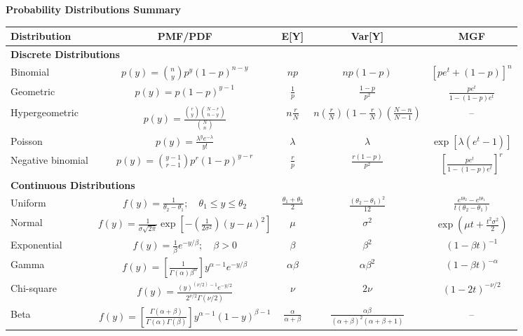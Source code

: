 \documentclass[10pt]{article}
\begin{document}
\begin{center}
\textbf{\Large Probability Distributions Summary}
\end{center}

\vspace{-2mm}
\renewcommand{\arraystretch}{1.6}
\begin{center}
\begin{tabular}{@{}l c c c c@{}}
\toprule
\textbf{Distribution} & \textbf{PMF/PDF} & \textbf{E[Y]} & \textbf{Var[Y]} & \textbf{MGF} \\
\midrule
\multicolumn{5}{l}{\textbf{Discrete Distributions}} \\
Binomial & $p(y) = \binom{n}{y} p^y (1-p)^{n-y}$ & $np$ & $np(1-p)$ & $[pe^t + (1-p)]^n$ \\
Geometric & $p(y) = p(1-p)^{y-1}$ & $\frac{1}{p}$ & $\frac{1-p}{p^2}$ & $\frac{pe^t}{1-(1-p)e^t}$ \\
Hypergeometric & $p(y) = \frac{\binom{r}{y}\binom{N-r}{n-y}}{\binom{N}{n}}$ & $n\frac{r}{N}$ & $n\left(\frac{r}{N}\right)\left(1-\frac{r}{N}\right)\left(\frac{N-n}{N-1}\right)$ & -- \\
Poisson & $p(y) = \frac{\lambda^y e^{-\lambda}}{y!}$ & $\lambda$ & $\lambda$ & $\exp[\lambda(e^t - 1)]$ \\
Negative binomial & $p(y) = \binom{y-1}{r-1} p^r (1-p)^{y-r}$ & $\frac{r}{p}$ & $\frac{r(1-p)}{p^2}$ & $\left[\frac{pe^t}{1-(1-p)e^t}\right]^r$ \\
\midrule
\multicolumn{5}{l}{\textbf{Continuous Distributions}} \\
Uniform & $f(y) = \frac{1}{\theta_2 - \theta_1}; \quad \theta_1 \le y \le \theta_2$ & $\frac{\theta_1 + \theta_2}{2}$ & $\frac{(\theta_2 - \theta_1)^2}{12}$ & $\frac{e^{t\theta_2} - e^{t\theta_1}}{t(\theta_2 - \theta_1)}$ \\
Normal & $f(y) = \frac{1}{\sigma\sqrt{2\pi}}\exp\left[-\left(\frac{1}{2\sigma^2}\right)(y-\mu)^2\right]$ & $\mu$ & $\sigma^2$ & $\exp\left(\mu t + \frac{t^2\sigma^2}{2}\right)$ \\
Exponential & $f(y) = \frac{1}{\beta}e^{-y/\beta}; \quad \beta > 0$ & $\beta$ & $\beta^2$ & $(1-\beta t)^{-1}$ \\
Gamma & $f(y) = \left[\frac{1}{\Gamma(\alpha)\beta^\alpha}\right] y^{\alpha-1}e^{-y/\beta}$ & $\alpha\beta$ & $\alpha\beta^2$ & $(1-\beta t)^{-\alpha}$ \\
Chi-square & $f(y) = \frac{(y)^{(\nu/2)-1}e^{-y/2}}{2^{\nu/2}\Gamma(\nu/2)}$ & $\nu$ & $2\nu$ & $(1-2t)^{-\nu/2}$ \\
Beta & $f(y) = \left[\frac{\Gamma(\alpha+\beta)}{\Gamma(\alpha)\Gamma(\beta)}\right] y^{\alpha-1}(1-y)^{\beta-1}$ & $\frac{\alpha}{\alpha+\beta}$ & $\frac{\alpha\beta}{(\alpha+\beta)^2(\alpha+\beta+1)}$ & -- \\
\bottomrule
\end{tabular}
\end{center}
\end{document}
